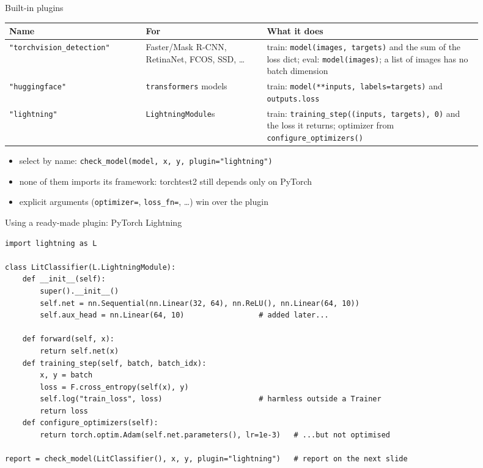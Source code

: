 \documentclass[aspectratio=169,11pt]{beamer}
\newcommand{\tool}{\textsf{torchtest2}}
\begin{document}
\begin{frame}{Built-in plugins}
  \scriptsize
  \begin{tabular}{p{0.26\linewidth}p{0.23\linewidth}p{0.41\linewidth}}
    \toprule
    Name & For & What it does \\
    \midrule
    \texttt{"torchvision\_detection"} & Faster/Mask R-CNN, RetinaNet, FCOS, SSD, \ldots &
      train: \texttt{model(images, targets)} and the sum of the loss dict; eval:
      \texttt{model(images)}; a list of images has no batch dimension \\
    \texttt{"huggingface"} & \texttt{transformers} models &
      train: \texttt{model(**inputs, labels=targets)} and \texttt{outputs.loss} \\
    \texttt{"lightning"} & \texttt{LightningModule}s &
      train: \texttt{training\_step((inputs, targets), 0)} and the loss it returns; optimizer
      from \texttt{configure\_optimizers()} \\
    \bottomrule
  \end{tabular}
  \bigskip

  \normalsize
  \begin{itemize}
    \item select by name: \texttt{check\_model(model, x, y, plugin="lightning")}
    \item none of them imports its framework: \tool{} still depends only on PyTorch
    \item explicit arguments (\texttt{optimizer=}, \texttt{loss\_fn=}, \ldots) win over the plugin
  \end{itemize}
\end{frame}

\begin{frame}[fragile]{Using a ready-made plugin: PyTorch Lightning}
  \begin{lstlisting}
import lightning as L

class LitClassifier(L.LightningModule):
    def __init__(self):
        super().__init__()
        self.net = nn.Sequential(nn.Linear(32, 64), nn.ReLU(), nn.Linear(64, 10))
        self.aux_head = nn.Linear(64, 10)                 # added later...

    def forward(self, x):
        return self.net(x)
    def training_step(self, batch, batch_idx):
        x, y = batch
        loss = F.cross_entropy(self(x), y)
        self.log("train_loss", loss)                      # harmless outside a Trainer
        return loss
    def configure_optimizers(self):
        return torch.optim.Adam(self.net.parameters(), lr=1e-3)   # ...but not optimised

report = check_model(LitClassifier(), x, y, plugin="lightning")   # report on the next slide
  \end{lstlisting}
\end{frame}
\end{document}
